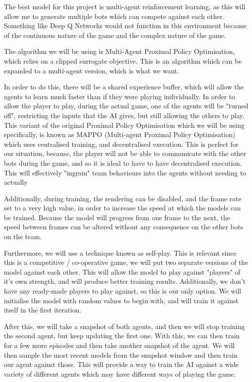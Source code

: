 \vs
The best model for this project is multi-agent reinforcement learning, as this will allow me to generate multiple bots which can compete against each other. Something like Deep Q Networks would not function in this environment because of the continuous nature of the game and the complex nature of the game.

\vs
The algorithm we will be using is Multi-Agent Proximal Policy Optimisation, which relies on a clipped surrogate objective. This is an algorithm which can be expanded to a multi-agent version, which is what we want.

\vs
In order to do this, there will be a shared experience buffer, which will allow the agents to learn much faster than if they were playing individually. In order to allow the player to play, during the actual game, one of the agents will be "turned off", restricting the inputs that the AI gives, but still allowing the others to play. This variant of the original Proximal Policy Optimisation which we will be using specifically, is known as MAPPO (Multi-agent Proximal Policy Optimisation) which uses centralised training, and decentralised execution. This is perfect for our situation, because, the player will not be able to communicate with the other bots during the game, and so it is ideal to have to have decentralised execution. This will effectively "ingrain" team behaviours into the agents without needing to actually 

\vs
Additionally, during training, the rendering can be disabled, and the frame rate set to a very high value, in order to increase the speed at which the models can be trained. Because the model will progress from one frame to the next, the speed between frames can be altered without any consequence on the other bots on the team.

\vs
Furthermore, we will use a technique known as self-play. This is relevant since this is a competitive / co-operative game, we will put two separate versions of the model against each other. This will allow the model to play against "players" of it's own strength, and will produce better training results. Additionally, we don't have any ready-made players to play against, so this is our only option. We will initialise the model with random values to begin with, and will train it against itself in the first iteration. 

\vs
After this, we will take a snapshot of both agents, and then we will stop training the second agent, but keep updating the first one. With this, we can then train for a few more episodes and then take another snapshot of the agent. We will then sample the most recent models from the snapshot window and then train our agent against those. This will provide a way to train the AI against a wide variety of different agents which may have different ways of playing the game.

